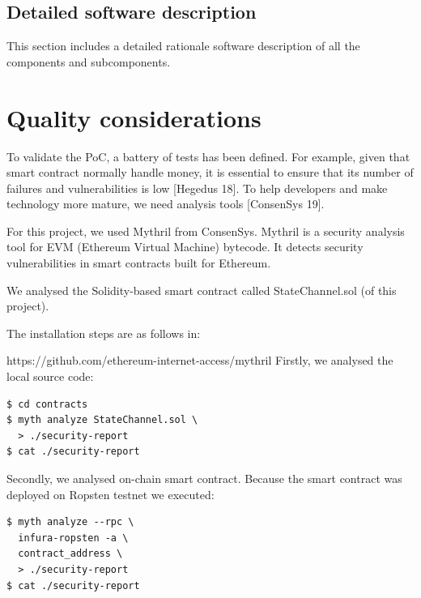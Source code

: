 \documentclass[12pt]{amsart}
\begin{document}
\begin{multicols}{2}
\subsection{Detailed software description}

\vspace{0.35cm}

This section includes a detailed rationale software description of all
the components and subcomponents.



\section{Quality considerations}\label{sec:proofs}

\vspace{0.35cm}

To validate the PoC, a battery of tests has been defined. For example, given
that smart contract normally handle money, it is essential to ensure that
its number of failures and vulnerabilities is low [Hegedus 18].
To help developers and make technology more mature,
we need analysis tools [ConsenSys 19].

\vspace{0.35cm}

For this project, we used Mythril from ConsenSys. Mythril is a
security analysis tool for EVM (Ethereum Virtual Machine) bytecode.
It detects security vulnerabilities in smart contracts built for Ethereum.

\vspace{0.35cm}

We analysed the Solidity-based smart contract called
StateChannel.sol (of this project).

The installation steps are as follows in:

https://github.com/ethereum-internet-access/mythril
Firstly, we analysed the local source code:

\begin{verbatim}
$ cd contracts
$ myth analyze StateChannel.sol \
  > ./security-report
$ cat ./security-report
\end{verbatim}

\vspace{0.35cm}

Secondly, we analysed on-chain smart contract.
Because the smart contract was deployed on Ropsten testnet we executed:

\begin{verbatim}
$ myth analyze --rpc \
  infura-ropsten -a \
  contract_address \
  > ./security-report
$ cat ./security-report
\end{verbatim}



\end{multicols}
\end{document}
